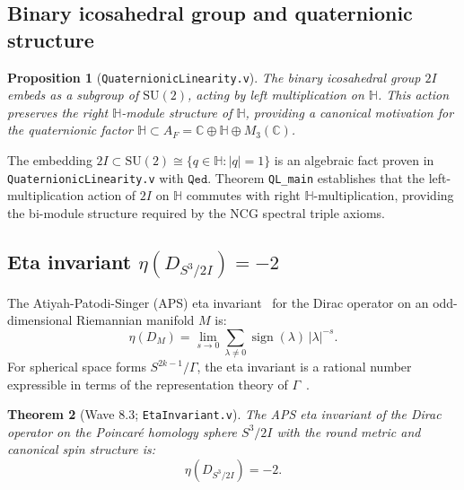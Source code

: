 \documentclass[12pt,a4paper]{article}
\newtheorem{theorem}{Theorem}[section]
\newtheorem{proposition}[theorem]{Proposition}
\newcommand{\AF}{A_F}
\newcommand{\TwoI}{2I}
\newcommand{\Qed}{\texttt{Qed}}
\begin{document}
\subsection{Binary icosahedral group and quaternionic structure}
\label{sec:2I}

\begin{proposition}[\texttt{QuaternionicLinearity.v}]
\label{prop:2I}
The binary icosahedral group \(\TwoI\) embeds as a subgroup of \(\mathrm{SU}(2)\), acting
by left multiplication on \(\mathbb{H}\). This action preserves the right \(\mathbb{H}\)-module
structure of \(\mathbb{H}\), providing a canonical motivation for the quaternionic factor
\(\mathbb{H} \subset \AF = \mathbb{C} \oplus \mathbb{H} \oplus M_3(\mathbb{C})\).
\end{proposition}

The embedding \(\TwoI \subset \mathrm{SU}(2) \cong \{q \in \mathbb{H} : |q| = 1\}\)
is an algebraic fact proven in \texttt{QuaternionicLinearity.v} with \(\Qed\). Theorem
\texttt{QL\_main} establishes that the left-multiplication action of \(\TwoI\) on
\(\mathbb{H}\) commutes with right \(\mathbb{H}\)-multiplication, providing the
bi-module structure required by the NCG spectral triple axioms.

\subsection{Eta invariant \(\eta(D_{S^3/\TwoI}) = -2\)}
\label{sec:eta}

The Atiyah-Patodi-Singer (APS) eta invariant~\cite{Atiyah:1975jf} for the Dirac operator
on an odd-dimensional Riemannian manifold \(M\) is:
\begin{equation}
  \eta(D_M) = \lim_{s \to 0} \sum_{\lambda \neq 0}
  \operatorname{sign}(\lambda)\,|\lambda|^{-s}.
  \label{eq:eta_def}
\end{equation}
For spherical space forms \(S^{2k-1}/\Gamma\), the eta invariant is a rational number
expressible in terms of the representation theory of \(\Gamma\)~\cite{Gilkey:1995}.

\begin{theorem}[Wave 8.3; \texttt{EtaInvariant.v}]
\label{thm:eta}
The APS eta invariant of the Dirac operator on the Poincar\'e homology sphere
\(S^3/\TwoI\) with the round metric and canonical spin structure is:
\begin{equation}
  \eta(D_{S^3/\TwoI}) = -2.
  \label{eq:eta_result}
\end{equation}
\end{theorem}
\end{document}
